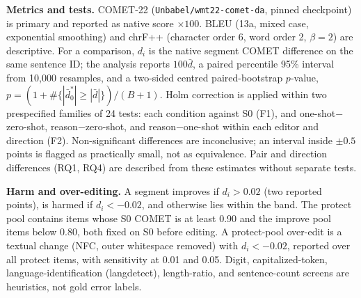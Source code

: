 \textbf{Metrics and tests.} COMET-22 (\nolinkurl{Unbabel/wmt22-comet-da}, pinned checkpoint) is primary and reported as native score $\times100$. BLEU (13a, mixed case, exponential smoothing) and chrF++ (character order 6, word order 2, $\beta{=}2$) are descriptive. For a comparison, $d_i$ is the native segment COMET difference on the same sentence ID; the analysis reports $100\bar d$, a paired percentile 95\% interval from 10{,}000 resamples, and a two-sided centred paired-bootstrap $p$-value, $p=(1+\#\{|\bar d^{*}_0|\ge|\bar d|\})/(B+1)$. Holm correction is applied within two prespecified families of 24 tests: each condition against S0 (F1), and one-shot$-$zero-shot, reason$-$zero-shot, and reason$-$one-shot within each editor and direction (F2). Non-significant differences are inconclusive; an interval inside $\pm0.5$ points is flagged as practically small, not as equivalence. Pair and direction differences (RQ1, RQ4) are described from these estimates without separate tests.

\textbf{Harm and over-editing.} A segment improves if $d_i>0.02$ (two reported points), is harmed if $d_i<-0.02$, and otherwise lies within the band. The protect pool contains items whose S0 COMET is at least 0.90 and the improve pool items below 0.80, both fixed on S0 before editing. A protect-pool over-edit is a textual change (NFC, outer whitespace removed) with $d_i<-0.02$, reported over all protect items, with sensitivity at 0.01 and 0.05. Digit, capitalized-token, language-identification (langdetect), length-ratio, and sentence-count screens are heuristics, not gold error labels.
